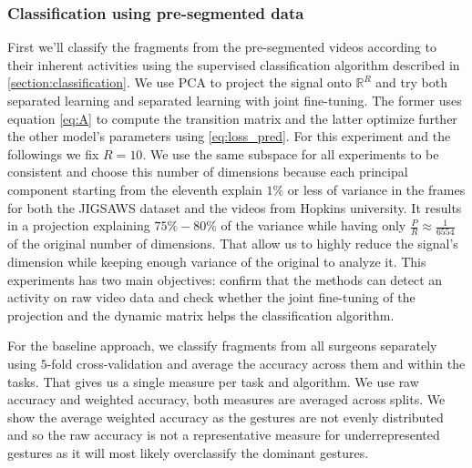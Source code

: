 \documentclass[twocolumn,10pt]{asme2ej}
\begin{document}
\subsubsection{Classification using pre-segmented data}
\label{section:classification-presegmented}

First we'll classify the fragments from the pre-segmented videos according to their inherent activities using the supervised classification algorithm described in \ref{section:classification}. We use PCA to project the signal onto $\mathbb{R}^R$ and try both separated learning and separated learning with joint fine-tuning. The former uses equation \eqref{eq:A} to compute the transition matrix and the latter optimize further the other model's parameters using \eqref{eq:loss_pred}. For this experiment and the followings we fix $R=10$. We use the same subspace for all experiments to be consistent and choose this number of dimensions because each principal component starting from the eleventh explain $1\%$ or less of variance in the frames for both the JIGSAWS dataset and the videos from Hopkins university. It results in a projection explaining $75\% -80\%$ of the variance while having only $\frac{P}{R}\approx \frac{1}{6554}$ of the original number of dimensions. That allow us to highly reduce the signal's dimension while keeping enough variance of the original to analyze it. This experiments has two main objectives: confirm that the methods can detect an activity on raw video data and check whether the joint fine-tuning of the projection and the dynamic matrix helps the classification algorithm.

For the baseline approach, we classify fragments from all surgeons separately using $5$-fold cross-validation and average the accuracy across them and within the tasks. That gives us a single measure per task and algorithm. We use raw accuracy and weighted accuracy, both measures are averaged across splits. We show the average weighted accuracy as the gestures are not evenly distributed and so the raw accuracy is not a representative measure for underrepresented gestures as it will most likely overclassify the dominant gestures.
\end{document}
